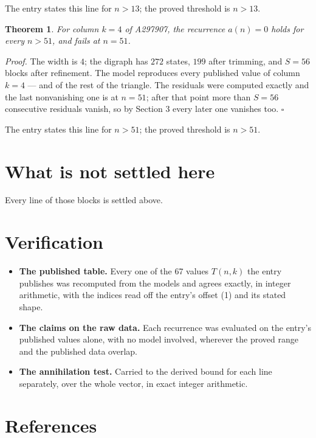\documentclass[11pt]{article}
\newtheorem{theorem}{Theorem}
\theoremstyle{definition}
\begin{document}
The entry states this line for $n > 13$; the proved threshold is $n > 13$.

\begin{theorem} For column $k = 4$ of A297907, the recurrence $a(n) = 0$ holds for every $n > 51$, and fails at $n = 51$.\end{theorem}

{\itshape Proof.} The width is $4$; the digraph has $272$ states, $199$ after trimming, and $S = 56$ blocks after refinement. The model reproduces every published value of column $k = 4$ --- and of the rest of the triangle. The residuals were computed exactly and the last nonvanishing one is at $n = 51$; after that point more than $S = 56$ consecutive residuals vanish, so by Section 3 every later one vanishes too. $\square$

The entry states this line for $n > 51$; the proved threshold is $n > 51$.

\section{What is not settled here}

Every line of those blocks is settled above.

\section{Verification}

\begin{itemize}

\item {\bfseries The published table.} Every one of the 67 values $T(n,k)$ the entry publishes was recomputed from the models and agrees exactly, in integer arithmetic, with the indices read off the entry's offset (1) and its stated shape.

\item {\bfseries The claims on the raw data.} Each recurrence was evaluated on the entry's published values alone, with no model involved, wherever the proved range and the published data overlap.

\item {\bfseries The annihilation test.} Carried to the derived bound for each line separately, over the whole vector, in exact integer arithmetic.

\end{itemize}

\section{References}
\end{document}
